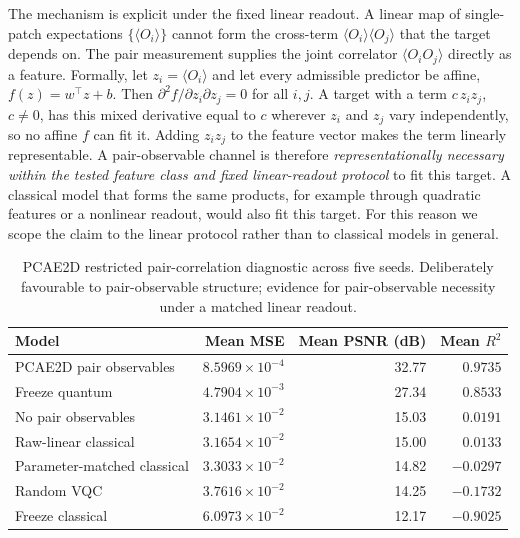 \documentclass[pdflatex,sn-basic]{sn-jnl}
\begin{document}
The mechanism is explicit under the fixed linear readout. A linear map of
single-patch expectations $\{\langle O_i\rangle\}$ cannot form the cross-term
$\langle O_i\rangle\langle O_j\rangle$ that the target depends on. The
pair measurement supplies the joint correlator $\langle O_iO_j\rangle$ directly as a
feature. Formally, let $z_i=\langle O_i\rangle$ and let every admissible
predictor be affine, $f(z)=w^{\top}z+b$. Then
$\partial^2 f/\partial z_i\partial z_j=0$ for all $i,j$. A target with a term
$c\,z_iz_j$, $c\neq0$, has this mixed derivative equal to $c$ wherever $z_i$ and
$z_j$ vary independently, so no affine $f$ can fit it. Adding $z_iz_j$ to the
feature vector makes the term linearly representable.
A pair-observable channel is therefore
\emph{representationally necessary within the tested feature class and fixed
linear-readout protocol} to fit this target.
A classical model that forms the same products, for example through
quadratic features or a nonlinear readout, would also fit this target. For this
reason we scope the claim to the linear protocol rather than to classical models in general.

\begin{table}[t]
  \centering
  \caption[PCAE2D restricted pair-correlation diagnostic]{PCAE2D restricted pair-correlation diagnostic across five seeds.
           Deliberately favourable to pair-observable structure; evidence for
           pair-observable necessity under a matched linear readout.}
  \label{tab:hvk_pair_diagnostic}
  \begin{tabular}{@{}l r r r@{}}
    \toprule
    Model                            & Mean MSE                  & Mean PSNR (dB) & Mean $R^2$ \\
    \midrule
    PCAE2D pair observables     & $8.5969\times10^{-4}$     & 32.77          & $ 0.9735$  \\
    Freeze quantum                   & $4.7904\times10^{-3}$     & 27.34          & $ 0.8533$  \\
    No pair observables & $3.1461\times10^{-2}$     & 15.03          & $ 0.0191$  \\
    Raw-linear classical             & $3.1654\times10^{-2}$     & 15.00          & $ 0.0133$  \\
    Parameter-matched classical      & $3.3033\times10^{-2}$     & 14.82          & $-0.0297$  \\
    Random VQC                       & $3.7616\times10^{-2}$     & 14.25          & $-0.1732$  \\
    Freeze classical                 & $6.0973\times10^{-2}$     & 12.17          & $-0.9025$  \\
    \bottomrule
  \end{tabular}
\end{table}
\end{document}
